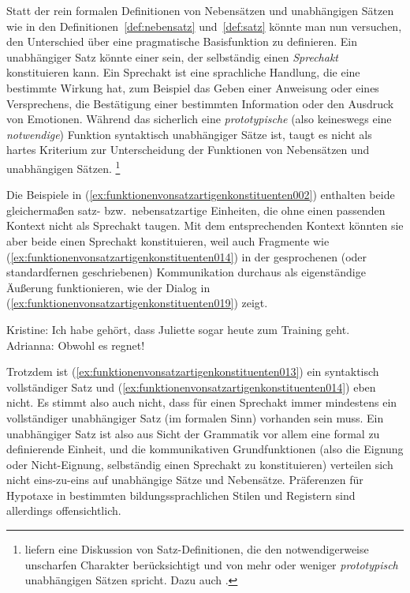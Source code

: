 
Statt der rein formalen Definitionen von Nebensätzen und unabhängigen Sätzen wie in den Definitionen~\ref{def:nebensatz} und~\ref{def:satz} könnte man nun versuchen, den Unterschied über eine pragmatische Basisfunktion zu definieren.
Ein unabhängiger Satz könnte einer sein, der selbständig einen \textit{Sprechakt} konstituieren kann.
Ein Sprechakt ist eine sprachliche Handlung, die eine bestimmte Wirkung hat, zum Beispiel das Geben einer Anweisung oder eines Versprechens, die Bestätigung einer bestimmten Information oder den Ausdruck von Emotionen.
Während das sicherlich eine \textit{prototypische} (also keineswegs eine \textit{notwendige}) Funktion syntaktisch unabhängiger Sätze ist, taugt es nicht als hartes Kriterium zur Unterscheidung der Funktionen von Nebensätzen und unabhängigen Sätzen.%
\footnote{\citet{PantherKoepcke2008} liefern eine Diskussion von Satz-Definitionen, die den notwendigerweise unscharfen Charakter berücksichtigt und von mehr oder weniger \textit{prototypisch} unabhängigen Sätzen spricht.
Dazu auch \citet{SchaeferSayatz2016}.}

Die Beispiele in (\ref{ex:funktionenvonsatzartigenkonstituenten002}) enthalten beide gleichermaßen satz- bzw.\ nebensatzartige Einheiten, die ohne einen passenden Kontext nicht als Sprechakt taugen.
Mit dem entsprechenden Kontext könnten sie aber beide einen Sprechakt konstituieren, weil auch Fragmente wie (\ref{ex:funktionenvonsatzartigenkonstituenten014}) in der gesprochenen (oder standardfernen geschriebenen) Kommunikation durchaus als eigenständige Äußerung funktionieren, wie der Dialog in (\ref{ex:funktionenvonsatzartigenkonstituenten019}) zeigt.

\begin{exe}
  \ex\label{ex:funktionenvonsatzartigenkonstituenten012}
  \begin{xlist}
  \end{xlist}
  \ex\label{ex:funktionenvonsatzartigenkonstituenten019} Kristine: Ich habe gehört, dass Juliette sogar heute zum Training geht.\\
  Adrianna: Obwohl es regnet!
\end{exe}

Trotzdem ist (\ref{ex:funktionenvonsatzartigenkonstituenten013}) ein syntaktisch vollständiger Satz und (\ref{ex:funktionenvonsatzartigenkonstituenten014}) eben nicht.
Es stimmt also auch nicht, dass für einen Sprechakt immer mindestens ein vollständiger unabhängiger Satz (im formalen Sinn) vorhanden sein muss.
Ein unabhängiger Satz ist also aus Sicht der Grammatik vor allem eine formal zu definierende Einheit, und die kommunikativen Grundfunktionen (also die Eignung oder Nicht-Eignung, selbständig einen Sprechakt zu konstituieren) verteilen sich nicht eins-zu-eins auf unabhängige Sätze und Nebensätze.
Präferenzen für Hypotaxe in bestimmten bildungssprachlichen Stilen und Registern sind allerdings offensichtlich.


